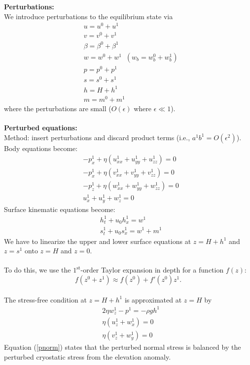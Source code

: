 \documentclass[paper=a4, fontsize=11pt]{article}
\begin{document}
\noindent\textbf{Perturbations:}\\
We introduce perturbations to the equilibrium state via
\begin{align}
&u= u^0 +  u^1 \\
&v= v^0 +  v^1 \\
&\beta = \beta^0 + \beta^1 \\
&w =  w^0 + w^1 \;\; (w_b=w_b^0 + w_b^1)\\
&p = p^0 +  p^1\\
&s =  s^0 + s^1 \\
&h = H +  h^1 \\
&m = m^0 + m^1
\end{align}
where the perturbations are small ($O(\epsilon)$ where $\epsilon \ll 1$). \\ \\
\noindent\textbf{Perturbed equations:}\\
Method: insert perturbations and discard product terms (i.e., $a^1b^1=O(\epsilon^2)$).\\
Body equations become:
\begin{align}
&-p_x^1 + \eta (u_{xx}^1 +u_{yy}^1+ u_{zz}^1) = 0 \\
&-p_x^1 + \eta (v_{xx}^1 +v_{yy}^1+ v_{zz}^1) = 0 \\
&-p_z^1 + \eta (w_{xx}^1 +w_{yy}^1+ w_{zz}^1) = 0\\
&u_x^1 + u_y^1 + w_z^1 = 0
\end{align}
Surface kinematic equations become:
\begin{align}
&h_t^1 + u_0 h_x^1  = w^1 \label{ht} \\
&s_t^1  + u_0 s_x^1 = w^1 + m^1 \label{st}
\end{align}
We have to linearize the upper and lower surface equations at $z=H +  h^1$
and $z= s^1$ onto $z=H$ and $z=0$.
\\ \\
To do this, we
use the $1^\mathrm{st}$-order Taylor expansion in depth for a function $f(z)$:
$$ f(z^0 + z^1) \approx f(z^0) + f'(z^0)z^1. $$
\\
The stress-free condition at $z=H+h^1$ is approximated at $z=H$ by
\begin{align}
&2\eta w_z^1 - p^1 = -\rho g h^1 \label{pnorm} \\
&\eta(u_z^1 +w_x^1) = 0 \\
&\eta(v_z^1 +w_y^1) = 0
\end{align}
Equation (\ref{pnorm}) states that the perturbed normal stress is balanced
by the perturbed cryostatic stress from the elevation anomaly.
\end{document}
